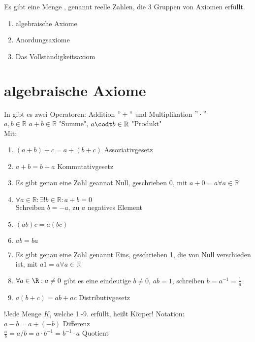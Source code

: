 \documentclass[../main.tex]{subfiles}
\begin{document}
Es gibt eine Menge , genannt reelle Zahlen, die 3 Gruppen von Axiomen erfüllt.
\begin{enumerate}
    \item algebraische Axiome
    \item Anordungsaxiome
    \item Das Vollständigkeitsaxiom
\end{enumerate}
\section{algebraische Axiome}
In  gibt es zwei Operatoren: Addition $"+"$ und Multiplikation $"\cdot"$\\
$a,b \in \mathbb{R}$ $a+b\in \mathbb{R}$ "Summe", $a\codt b\in \mathbb{R}$ "Produkt"\\
Mit:
\begin{enumerate}
    \item $(a+b)+c=a+(b+c)$ Assoziativgesetz
    \item $a+b=b+a$ Kommutativgesetz
    \item Es gibt genau eine Zahl geannat Null, geschrieben 0, mit $a+0=a\forall a\in \mathbb{R}$
    \item $\forall a\in \mathbb{R}: \exists ! b\in \mathbb{R} : a+b=0$\\
    Schreiben $b=-a$, zu $a $ negatives Element
    \item $(ab)c=a(bc)$
    \item $ab=ba$
    \item Es gibt genau eine Zahl genannt Eins, geschrieben 1, die von Null verschieden ist, mit $a1=a \forall a\in \mathbb{R}$
    \item $\forall a\in \R : a\neq 0$ gibt es eine eindeutige $b\neq 0$, $ab=1$, schreiben $b=a^{-1}=\frac{1}{a}$
    \item $a(b+c)=ab+ac$ Distributivgesetz
\end{enumerate}
!Jede Menge $K$, welche 1.-9. erfüllt, heißt Körper!
Notation:\\
$a-b=a+(-b)$ Differenz\\
$\frac{a}{b} = a/b= a\cdot b^{-1}=b^{-1}\cdot a$ Quotient
\end{document}
